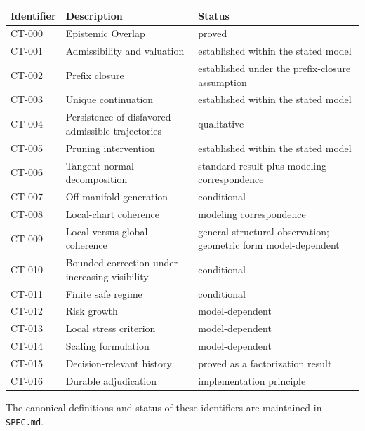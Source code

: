 \documentclass[11pt]{article}
\theoremstyle{definition}
\theoremstyle{remark}
\begin{document}
\begin{center}
\small
\begin{tabular}{@{}p{1.5cm}p{6.4cm}p{5.2cm}@{}}
\toprule
Identifier & Description & Status \\
\midrule
CT-000 & Epistemic Overlap & proved \\
CT-001 & Admissibility and valuation & established within the stated model \\
CT-002 & Prefix closure & established under the prefix-closure assumption \\
CT-003 & Unique continuation & established within the stated model \\
CT-004 & Persistence of disfavored admissible trajectories & qualitative \\
CT-005 & Pruning intervention & established within the stated model \\
CT-006 & Tangent-normal decomposition & standard result plus modeling correspondence \\
CT-007 & Off-manifold generation & conditional \\
CT-008 & Local-chart coherence & modeling correspondence \\
CT-009 & Local versus global coherence & general structural observation; geometric form model-dependent \\
CT-010 & Bounded correction under increasing visibility & conditional \\
CT-011 & Finite safe regime & conditional \\
CT-012 & Risk growth & model-dependent \\
CT-013 & Local stress criterion & model-dependent \\
CT-014 & Scaling formulation & model-dependent \\
CT-015 & Decision-relevant history & proved as a factorization result \\
CT-016 & Durable adjudication & implementation principle \\
\bottomrule
\end{tabular}
\end{center}

\bigskip

\noindent
The canonical definitions and status of these identifiers are maintained in
\texttt{SPEC.md}.
\end{document}

